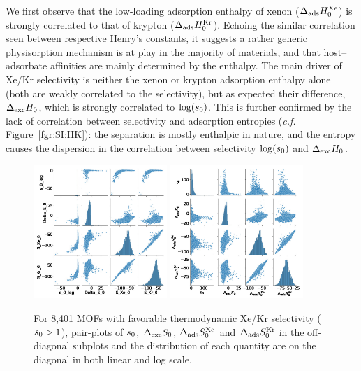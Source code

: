 \documentclass[main.tex]{subfiles}
\begin{document}
We first observe that the low-loading adsorption enthalpy of xenon ($\Delta_{\text{ads}}H^{\text{Xe}}_{\text{0}}$) is strongly correlated to that of krypton ($\Delta_{\text{ads}}H^{\text{Kr}}_{\text{0}}$). Echoing the similar correlation seen between respective Henry's constants, it suggests a rather generic physisorption mechanism is at play in the majority of materials, and that host--adsorbate affinities are mainly determined by the enthalpy. The main driver of Xe/Kr selectivity is neither the xenon or krypton adsorption enthalpy alone (both are weakly correlated to the selectivity), but as expected their difference, $\Delta_{\text{exc}}H_{\text{0}}$, which is strongly correlated to $\log(s_{\text{0}})$. This is further confirmed by the lack of correlation between selectivity and adsorption entropies (\emph{c.f.} Figure~\ref{fgr:SI:HK}): the separation is mostly enthalpic in nature, and the entropy causes the dispersion in the correlation between selectivity $\log(s_{\text{0}})$ and $\Delta_{\text{exc}}H_{\text{0}}$.

\begin{figure}[h]
  \centering
    \includegraphics[width=0.45\textwidth]{figures/2-thermo/Entropy_0_log.jpg}
    \includegraphics[width=0.45\textwidth]{figures/2-thermo/Entropy_0.jpg}
    \caption{For 8,401 MOFs with favorable thermodynamic Xe/Kr selectivity ($s_{\text{0}} > 1$), pair-plots of $s_{\text{0}}$, $\Delta_{\text{exc}}S_{\text{0}}$, $\Delta_{\text{ads}}S^{\text{Xe}}_{\text{0}}$ and $\Delta_{\text{ads}}S^{\text{Kr}}_{\text{0}}$ in the off-diagonal subplots and the distribution of each quantity are on the diagonal in both linear and log scale.}
    \label{fgr:SI:HS_0_log}
  \end{figure}
\end{document}
